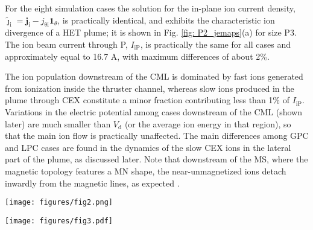 \documentclass[%
 aip,
cha,
 amsmath,amssymb,
 reprint,%
]{revtex4-1}
\begin{document}
For the eight simulation cases the solution for the in-plane ion current density, $\bm{\tilde\jmath}_\mathrm{i} = \bm j_\mathrm{i} - j_\mathrm{\theta i}\bm 1_\theta$, is practically identical, and exhibits the characteristic ion divergence of a HET plume; it is shown in Fig. \ref{fig: P2_jemaps}(a) for size P3. 
%
The ion beam current through P, $I_\mathrm{iP}$, is practically the same for all cases and approximately equal to 16.7 A, with maximum differences of about 2\%.
%

The ion population downstream of the CML is dominated by fast ions generated from ionization inside the thruster channel, whereas slow ions produced in the plume through CEX constitute a minor fraction contributing less than 1\% of $I_\mathrm{iP}$. Variations in the electric potential among cases downstream of the CML (shown later) are much smaller than $V_\mathrm{d}$ (or the average ion energy in that region), so that the main ion flow is practically unaffected.
%
The main differences among GPC and LPC cases are found in the dynamics of the slow CEX ions in the lateral part of the plume, as discussed later.
%
Note that downstream of the MS, where the magnetic topology features a MN shape, the near-unmagnetized ions detach inwardly from the magnetic lines, as expected \cite{meri14a}.


\begin{figure*}[!pht]
\centering
\texttt{[image: figures/fig2.png]}
\caption{
Plume sizes P1-P3 with C1 (the black square marker at $z/L_\mathrm{c}=1$) and with LPC (top row) and GPC (bottom row). 2D ($z$,$r$) contour maps and streamlines of $\tilde {\bm  \jmath}$.}
\label{fig: j_comp_P1P4}
\end{figure*}

\begin{figure*}[!t]
\centering
\texttt{[image: figures/fig3.pdf]}
\caption{
2D ($z$,$r$) contour maps of (a) $\tilde {\bm  \jmath}_\mathrm{i}$ and (b) $\tilde {\bm  \jmath}_\mathrm{e}$ for case GP3C1, and (c) $\tilde {\bm  \jmath}_\mathrm{e}$ for case LP3C1. The black lines with arrows depict streamlines of $\tilde {\bm  \jmath}_\mathrm{i}$ in (a) and $-\tilde {\bm  \jmath}_\mathrm{e}$ in (b) and (c). Magenta lines indicate magnetic lines. The black square marker at $z/L_\mathrm{c}=1$ indicates the location of cathode C1.
}
\label{fig: P2_jemaps}
\end{figure*}
\end{document}
